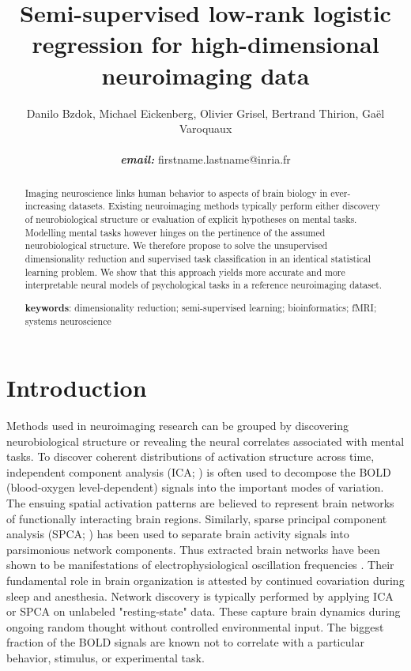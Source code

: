 \documentclass{article} %
\title{Semi-supervised low-rank logistic regression for
high-dimensional neuroimaging data}
\begin{document}
\author{Danilo Bzdok, Michael Eickenberg, Olivier Grisel,
  Bertrand Thirion,
  Ga\"el Varoquaux \\\\\textbf{\textit{email:} }firstname.lastname@inria.fr}

\maketitle

\begin{abstract}
Imaging neuroscience links human behavior to aspects of brain
biology in ever-increasing datasets.
%
Existing neuroimaging methods typically perform either discovery of
neurobiological structure or evaluation of explicit hypotheses on mental tasks.
%
Modelling mental tasks however hinges
on the pertinence of the assumed neurobiological structure.
%
We therefore propose to solve the unsupervised dimensionality reduction
and supervised task classification in
an identical statistical learning problem.
%
We show that this approach yields more accurate and more interpretable
neural models of psychological tasks in a reference neuroimaging dataset.
%

\textbf{keywords}: dimensionality reduction; semi-supervised learning;
bioinformatics; fMRI; systems neuroscience

\end{abstract}


\section{Introduction}
%
Methods used in neuroimaging research can be grouped by discovering
neurobiological structure or revealing the neural correlates associated
with mental tasks.
To discover coherent distributions of activation structure across time,
independent component analysis (ICA; \cite{beckmann2005}) is often used
to decompose the BOLD (blood-oxygen level-dependent) signals into the
important modes of variation.
The ensuing spatial activation patterns are believed to represent
brain networks of
functionally interacting brain regions.
Similarly, sparse principal component analysis (SPCA; \cite{varoqu2011})
has been used to
separate brain activity signals into parsimonious network components.
Thus extracted brain networks have been shown to be
manifestations of electrophysiological oscillation frequencies \cite{hipp15}.
Their fundamental role in brain organization is
attested by continued covariation during sleep and anesthesia.
%
Network discovery is typically performed by applying ICA or SPCA on
unlabeled "resting-state" data. These capture brain dynamics
during ongoing random thought without controlled environmental input.
The biggest fraction of the BOLD signals are known
not to correlate with a particular behavior, stimulus, or experimental task. 
\end{document}
